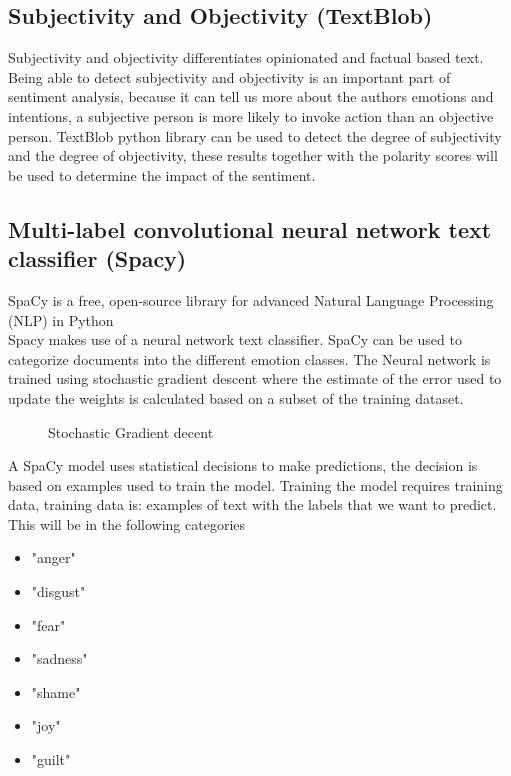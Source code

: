 \clearpage
\subsection{Subjectivity and Objectivity (TextBlob)}
Subjectivity and objectivity differentiates opinionated and factual based text. \cite{ref2}
Being able to detect subjectivity and objectivity is an important part of sentiment analysis, because it can tell us more about the authors emotions and intentions, a subjective person is more likely to invoke action than an objective person. TextBlob python library can be used to detect the degree of subjectivity and the degree of objectivity, these results together with the polarity scores will be used to determine the impact of the sentiment. 

\clearpage
\subsection{Multi-label convolutional neural network text classifier (Spacy)}

SpaCy is a free, open-source library for advanced Natural Language Processing (NLP) in Python \\
Spacy makes use of a neural network text classifier. SpaCy can be used to categorize documents into the different emotion classes.
The Neural network is trained using stochastic gradient descent where the estimate of the error used to update the weights is calculated based on a subset of the training dataset. \\


\begin{figure}[h]
  \centering
  \caption[Stochastic Gradient decent]%
  {Stochastic Gradient decent}
  \label{fig:ALAP:sm3}
\end{figure}






A SpaCy model uses statistical decisions to make predictions, the decision is based on examples used to train the model. Training the model requires training data, training data is: examples of text with the labels that we want to predict. This will be in the following categories
\begin{itemize}
\item "anger"
\item "disgust"
\item "fear"
\item "sadness"
\item "shame"
\item "joy"
\item "guilt"
\end{itemize}




